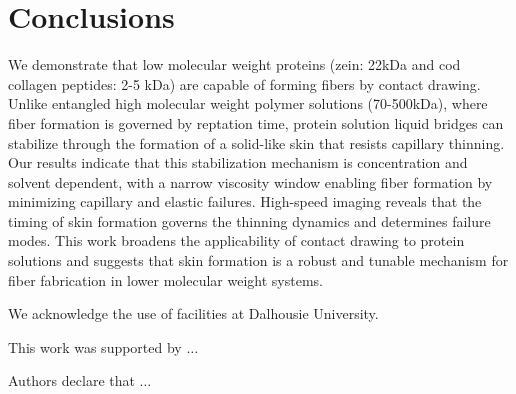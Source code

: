 \documentclass[lineno]{JFM-FLM_Au}
\begin{document}
\section{Conclusions}
We demonstrate that low molecular weight proteins (zein: 22kDa and cod collagen peptides: 2-5 kDa) are capable of forming fibers by contact drawing. Unlike entangled high molecular weight polymer solutions (70-500kDa), where fiber formation is governed by reptation time, protein solution liquid bridges can stabilize through the formation of a solid-like skin that resists capillary thinning. Our results indicate that this stabilization mechanism is concentration and solvent dependent, with a narrow viscosity window enabling fiber formation by minimizing capillary and elastic failures. High-speed imaging reveals that the timing of skin formation governs the thinning dynamics and determines failure modes. This work broadens the applicability of contact drawing to protein solutions and suggests that skin formation is a robust and tunable mechanism for fiber fabrication in lower molecular weight systems.


\begin{bmhead}[Acknowledgments]

We acknowledge the use of facilities at Dalhousie University. 

\end{bmhead}

\begin{bmhead}

This work was supported by $\ldots$

\end{bmhead}

\begin{bmhead}

Authors declare that $\ldots$

\end{bmhead}






\end{document}
